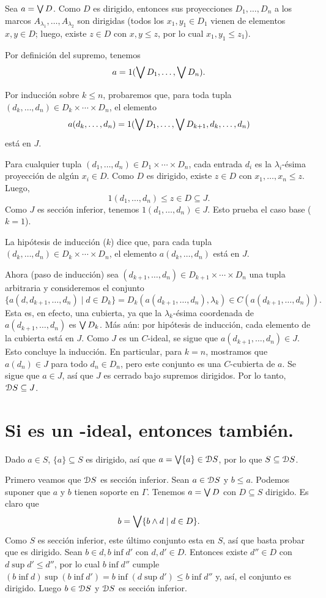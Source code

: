 Sea $a=\bigvee D$.
Como $D$ es dirigido, entonces sus proyecciones $D_1,\dots,D_n$ a
los marcos $A_{\lambda_1},\dots,A_{\lambda_2}$ son dirigidas
(todos los $x_1,y_1\in D_1$ vienen de elementos $x,y\in D$;
luego, existe $z\in D$ con $x,y\leq z$, por lo cual $x_1,y_1\leq
z_1$).

Por definición del supremo, tenemos
\[
  a = 1(\bigvee D_1,\dots,\bigvee D_n)
.\]

Por inducción sobre $k\leq n$, probaremos que, para toda tupla
$(d_k,\dots,d_n)\in D_k\times\cdots\times D_n$, el elemento
\[
  a(d_k,\dots,d_n)
  =
  1(\bigvee D_1,\dots,\bigvee D_{k+1},d_k,\dots,d_n)
\]
está en $J$.

Para cualquier tupla $(d_1,\dots,d_n)\in D_1\times\cdots\times
D_n$, cada entrada $d_i$ es la $\lambda_i$-ésima
proyección de algún $x_i\in D$.
Como $D$ es dirigido, existe $z\in D$ con $x_1,\dots,x_n\leq z$.
Luego,
\[
  1(d_1,\dots,d_n)\leq z\in D \subseteq J
.\]
Como $J$ es sección inferior, tenemos $1(d_1,\dots,d_n)\in J$.
Esto prueba el caso base ($k=1$).

La hipótesis de inducción ($k$) dice que, para cada tupla
$(d_k,\dots,d_n)\in D_k\times\cdots\times D_n$, el elemento
$a(d_k,\dots,d_n)$ está en $J$.

Ahora (paso de inducción) sea
$(d_{k+1},\dots,d_n)\in D_{k+1}\times\cdots\times D_n$ una tupla
arbitraria y consideremos el conjunto
\
\[
  \{a(d,d_{k+1},\dots,d_n) \mid d\in D_k\}
  =
  D_k(a(d_{k+1},\dots,d_n),\lambda_k)
  \in
  C(a(d_{k+1},\dots,d_n))
.\]
Esta es, en efecto, una cubierta, ya que la $\lambda_k$-ésima
coordenada de $a(d_{k+1},\dots,d_n)$ es $\bigvee D_k$.
Más aún: por hipótesis de inducción, cada elemento de la cubierta
está en $J$.
Como $J$ es un $C$-ideal, se sigue que
$a(d_{k+1},\dots,d_n)\in J$.
Esto concluye la inducción.
En particular, para $k=n$, mostramos que $a(d_n)\in J$ para todo
$d_n\in D_n$, pero este conjunto es una $C$-cubierta de $a$.
Se sigue que $a\in J$, así que $J$ es cerrado bajo supremos
dirigidos.
Por lo tanto, $\mathcal D S\subseteq J$.

\section{Si  es un -ideal,
entonces  también.}

Dado $a\in S$, $\{a\}\subseteq S$ es dirigido, así que
$a=\bigvee\{a\}\in \mathcal D S$, por lo que $S\subseteq\mathcal D S$.

Primero veamos que $\mathcal D S$ es sección inferior.
Sean $a\in \mathcal D S$ y $b\leq a$.
Podemos suponer que $a$ y $b$ tienen soporte en $\Gamma$.
Tenemos $a=\bigvee D$ con $D\subseteq S$ dirigido.
Es claro que
\[
  b = \bigvee\{b\wedge d\mid d\in D\}
.\]
Como $S$ es sección inferior, este último conjunto esta en $S$,
así que basta probar que es dirigido.
Sean $b\in d,b\inf d'$ con $d,d'\in D$.
Entonces existe $d''\in D$ con $d\sup d'\leq d''$, por lo
cual $b\inf d''$ cumple
$(b\inf d)\sup(b\inf d')=b\inf(d\sup d')\leq b\inf d''$ y, así,
el conjunto es dirigido.
Luego $b\in\mathcal D S$ y $\mathcal D S$ es sección inferior.

